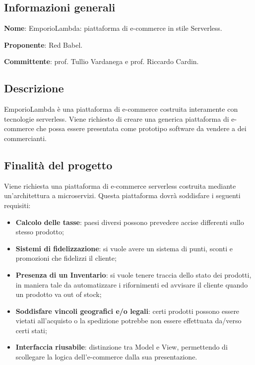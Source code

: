 \documentclass[../studio-di-fattibilita.tex]{subfiles}
\begin{document}
\subsection{Informazioni generali}%
\label{sub:informazioni_generale}
\begin{description}
  \item \textbf{Nome}: EmporioLambda: piattaforma di e-commerce in stile Serverless.
  \item \textbf{Proponente}: Red Babel.
  \item \textbf{Committente}: prof. Tullio Vardanega e prof. Riccardo Cardin.
\end{description}

\subsection{Descrizione}%
\label{sub:descrizione}
EmporioLambda è una piattaforma di e-commerce costruita interamente con tecnologie serverless.
Viene richiesto di creare una generica piattaforma di e-commerce che possa essere presentata come prototipo software da vendere a dei commercianti.


\subsection{Finalità del progetto}%
\label{sub:finalita_del_progetto}
Viene richiesta una piattaforma di e-commerce serverless costruita mediante un’architettura a microservizi. Questa piattaforma dovrà soddisfare i seguenti requisiti:
\begin{itemize}
  \item \textbf{Calcolo delle tasse}: paesi diversi possono prevedere accise differenti sullo stesso prodotto;
  \item \textbf{Sistemi di fidelizzazione}: si vuole avere un sistema di punti, sconti e promozioni che fidelizzi il cliente;
  \item \textbf{Presenza di un Inventario}: si vuole tenere traccia dello stato dei prodotti, in maniera tale da automatizzare i rifornimenti ed avvisare il cliente quando un prodotto va out of stock;
  \item \textbf{Soddisfare vincoli geografici e/o legali}: certi prodotti possono essere vietati all’acquisto o la spedizione potrebbe non essere effettuata da/verso certi stati;
  \item \textbf{Interfaccia riusabile}: distinzione tra Model e View, permettendo di scollegare la logica dell’e-commerce dalla sua presentazione.
\end{itemize}
\end{document}
